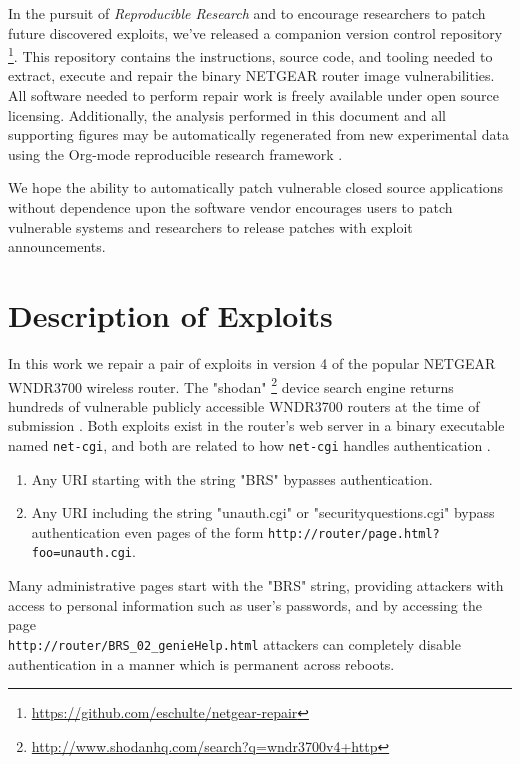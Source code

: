 \documentclass{sigcomm-alternate}
\begin{document}
In the pursuit of \emph{Reproducible Research} \cite{buckheit1995wavelab,mesirov2010accessible} and to encourage researchers to patch
future discovered exploits, we've released a companion version control
repository \footnote{\url{https://github.com/eschulte/netgear-repair}}.  This repository contains the instructions, source
code, and tooling needed to extract, execute and repair the binary
NETGEAR router image vulnerabilities.  All software needed to perform
repair work is freely available under open source licensing.
Additionally, the analysis performed in this document and all
supporting figures may be automatically regenerated from new
experimental data using the Org-mode reproducible research framework
\cite{schulte2012reproducible-research}.

We hope the ability to automatically patch vulnerable closed source
applications without dependence upon the software vendor encourages
users to patch vulnerable systems and researchers to release patches
with exploit announcements.

\section{Description of Exploits}
\label{sec-2}
In this work we repair a pair of exploits in version 4 of the popular
NETGEAR WNDR3700 wireless router.  The "shodan" \footnote{\url{http://www.shodanhq.com/search?q=wndr3700v4+http}} device search
engine returns hundreds of vulnerable publicly accessible WNDR3700
routers at the time of submission \cite{shodan}.  Both exploits exist in
the router's web server in a binary executable named \texttt{net-cgi}, and
both are related to how \texttt{net-cgi} handles authentication \cite{zcutlip}.

\begin{enumerate}
\item Any URI starting with the string "BRS" bypasses authentication.

\item Any URI including the string "unauth.cgi" or
  "securityquestions.cgi" bypass authentication even pages of the form
  \texttt{http://router/page.html?foo=unauth.cgi}.
\end{enumerate}

Many administrative pages start with the "BRS" string, providing
attackers with access to personal information such as user's
passwords, and by accessing the page\\
\texttt{http://router/BRS\_02\_genieHelp.html} attackers can
completely disable authentication in a manner which is permanent
across reboots.
\end{document}
